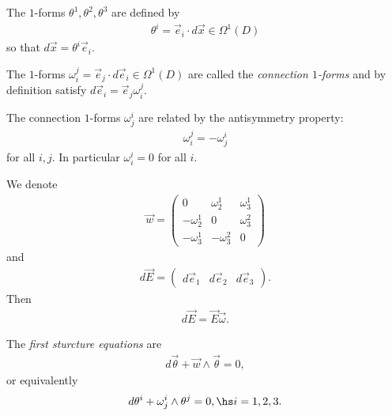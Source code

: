 \documentclass{article}
\begin{document}
\begin{definition}
	The $1$-forms $\theta^1,\theta^2,\theta^3$ are defined by
	\begin{align*}
		\theta^i = \vec e_i \cdot d\vec x \in \Omega^1(D)
	\end{align*}
	so that $d\vec x = \theta^i\vec e_i$.
\end{definition}

\begin{definition}
	The $1$-forms $\omega_i^j=\vec e_j\cdot d\vec e_i\in\Omega^1(D)$ are called the
	\emph{connection $1$-forms} and by definition satisfy $d\vec e_i = \vec e_j\omega_i^j$.
\end{definition}

\begin{proposition}
	The connection $1$-forms $\omega_j^i$ are related by the antisymmetry property:
	\begin{align*}
		\omega_i^j = -\omega_j^i
	\end{align*}
	for all $i,j$. In particular $\omega_i^i = 0$ for all $i$.
\end{proposition}

\begin{lemma}
	We denote
	\begin{align*}
		\vec w = \begin{pmatrix}
			0           & \omega_2^1  & \omega_3^1 \\
			-\omega_2^1 & 0           & \omega_3^2 \\
			-\omega_3^1 & -\omega_3^2 & 0
		\end{pmatrix}
	\end{align*}
	and
	\begin{align*}
		d\vec E = \begin{pmatrix}
			d\vec e_1 & d\vec e_2 & d\vec e_3
		\end{pmatrix}.
	\end{align*}
	Then
	\begin{align*}
		d\vec E = \vec E\vec\omega.
	\end{align*}
\end{lemma}

\begin{theorem}
	The \emph{first sturcture equations} are
	\begin{align*}
		d\vec\theta + \vec w \wedge \vec \theta = 0,
	\end{align*}
	or equivalently
	\begin{align*}
		d\theta^i + \omega_j^i \wedge \theta^j = 0,\hs i=1,2,3.
	\end{align*}
\end{theorem}
\end{document}
